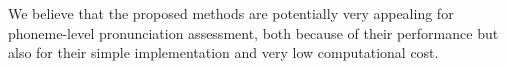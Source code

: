We believe that the proposed methods are potentially very appealing for phoneme-level pronunciation assessment, both because of their performance but also for their simple implementation and very low computational cost.
%
